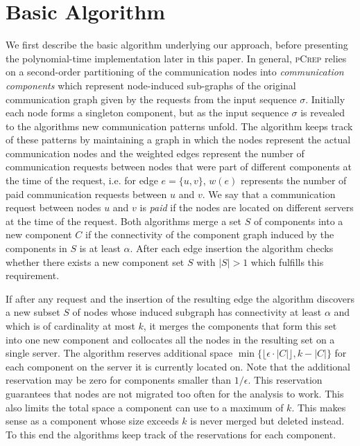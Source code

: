 \documentclass[a4paper,UKenglish,cleveref, autoref, thm-restate,authorcolumns]{lipics-v2019}
\newcommand{\adjDel}{\textsc{pCrep}}
\begin{document}
\section{Basic Algorithm}
\label{algIdeas}

We first describe the basic algorithm underlying
our approach, before presenting the polynomial-time implementation
later in this paper.
In general, \adjDel{} relies on a second-order partitioning of the communication nodes into \textit{communication components} which represent node-induced sub-graphs of the original communication graph given by the requests from the input sequence $\sigma$. 
Initially each node forms a singleton component, but as the input sequence $\sigma$ is revealed to the algorithms new communication patterns unfold. The algorithm keeps track of these patterns by maintaining a graph in which the nodes represent the actual communication nodes and the weighted edges represent the number of communication requests between nodes that were part of different components at the time of the request, i.e. for edge $e=\{u,v\}$, $w(e)$ represents the number of paid communication requests between $u$ and $v$. We say that a communication request between nodes $u$ and $v$ is \textit{paid} if the nodes are located on different servers at the time of the request.
Both algorithms merge a set $S$ of components into a new component $C$ if the connectivity of the component graph induced by the components in $S$ is at least $\alpha$. After each edge insertion the algorithm checks whether there exists a new component set $S$ with $|S|>1$ which fulfills this requirement.

If after any request and the insertion of the resulting edge the algorithm discovers a new subset $S$ of nodes whose induced subgraph has connectivity at least $\alpha$ and which is of cardinality at most $k$, it merges the components that form this set into one new component and collocates all the nodes in the resulting set on a single server. The algorithm reserves additional space $\min\{\lfloor\epsilon\cdot|C|\rfloor,k-|C|\}$ for each component on the server it is currently located on. Note that the additional reservation may be zero for components smaller than $1/\epsilon$. This reservation guarantees that nodes are not migrated too often for the analysis to work. This also limits the total space a component can use to a maximum of $k$. This makes sense as a component whose size exceeds $k$ is never merged but deleted instead.
To this end the algorithms keep track of the reservations for each component.
\end{document}
